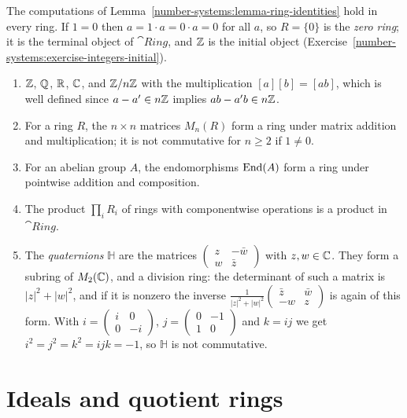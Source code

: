 \begin{remark}\label{rings:remark-zero-ring}
The computations of Lemma~\ref{number-systems:lemma-ring-identities} hold in every
ring. If $1 = 0$ then $a = 1 \cdot a = 0 \cdot a = 0$ for all $a$, so $R = \{0\}$ is the
\emph{zero ring}; it is the terminal object of $\cat{Ring}$, and $\mathbb{Z}$ is the initial
object (Exercise~\ref{number-systems:exercise-integers-initial}).
\end{remark}

\begin{example}\label{rings:example-rings}
\begin{enumerate}
\item $\mathbb{Z}$, $\mathbb{Q}$, $\mathbb{R}$, $\mathbb{C}$, and $\mathbb{Z}/n\mathbb{Z}$ with the multiplication
$[a][b] = [ab]$, which is well defined since $a - a' \in n\mathbb{Z}$ implies
$ab - a'b \in n\mathbb{Z}$.
\item For a ring $R$, the $n \times n$ matrices $M_n(R)$ form a ring under matrix
addition and multiplication; it is not commutative for $n \geq 2$ if $1 \neq 0$.
\item For an abelian group $A$, the endomorphisms $\operatorname{End}(A)$ form a ring under
pointwise addition and composition.
\item The product $\prod_i R_i$ of rings with componentwise operations is a
product in $\cat{Ring}$.
\item The \emph{quaternions} $\mathbb{H}$ are the matrices
$\begin{pmatrix} z & -\bar w \\ w & \bar z \end{pmatrix}$ with $z, w \in \mathbb{C}$. They form a
subring of $M_2(\mathbb{C})$, and a division ring: the determinant of such a matrix is
$|z|^2 + |w|^2$, and if it is nonzero the inverse
$\frac{1}{|z|^2 + |w|^2}\begin{pmatrix} \bar z & \bar w \\ -w & z \end{pmatrix}$ is again of this
form. With $i = \begin{pmatrix} i & 0 \\ 0 & -i \end{pmatrix}$,
$j = \begin{pmatrix} 0 & -1 \\ 1 & 0 \end{pmatrix}$ and $k = ij$ we get
$i^2 = j^2 = k^2 = ijk = -1$, so $\mathbb{H}$ is not commutative.
\end{enumerate}
\end{example}

\section{Ideals and quotient rings}\label{rings:section-ideals}


